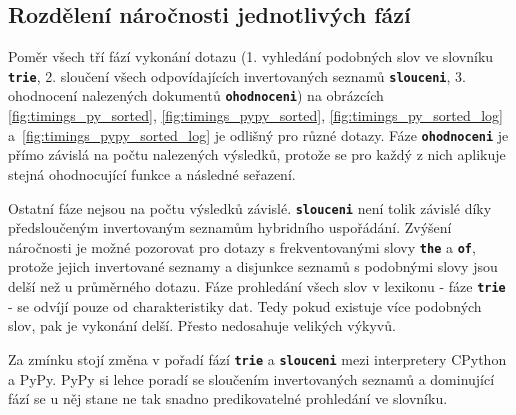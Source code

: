\documentclass[11pt,letterpaper,oneside,openright]{book}
\newcommand{\bftt}[1]{\texttt{\textbf{#1}}}
\begin{document}
\subsection{Rozdělení náročnosti jednotlivých fází} \label{sec:timings_query_parts}
Poměr všech tří fází vykonání dotazu (1. vyhledání podobných slov ve slovníku
\bftt{trie}, 2. sloučení všech odpovídajících invertovaných seznamů
\bftt{slouceni}, 3. ohodnocení nalezených dokumentů \bftt{ohodnoceni}) na
obrázcích \ref{fig:timings_py_sorted}, \ref{fig:timings_pypy_sorted},
\ref{fig:timings_py_sorted_log} a~\ref{fig:timings_pypy_sorted_log} je odlišný
pro různé dotazy. Fáze \bftt{ohodnoceni} je přímo závislá na počtu nalezených
výsledků, protože se pro každý z nich aplikuje stejná ohodnocující funkce a
následné seřazení.

Ostatní fáze nejsou na počtu výsledků závislé. \bftt{slouceni} není tolik
závislé díky předsloučeným invertovaným seznamům hybridního uspořádání. Zvýšení
náročnosti je možné pozorovat pro dotazy s frekventovanými slovy \bftt{the} a
\bftt{of}, protože jejich invertované seznamy a disjunkce seznamů s podobnými
slovy jsou delší než u průměrného dotazu. Fáze prohledání všech slov v lexikonu
- fáze \bftt{trie} - se odvíjí pouze od charakteristiky dat. Tedy pokud
existuje více podobných slov, pak je vykonání delší. Přesto nedosahuje
velikých výkyvů.

Za zmínku stojí změna v pořadí fází \bftt{trie} a \bftt{slouceni} mezi
interpretery CPython a PyPy. PyPy si lehce poradí se sloučením invertovaných
seznamů a dominující fází se u něj stane ne tak snadno predikovatelné
prohledání ve slovníku.


\end{document}
